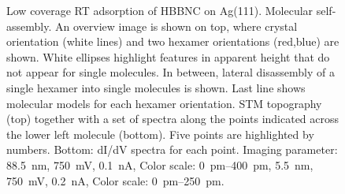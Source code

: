 \begin{figure}[]\centering
	 \quad
	\caption{Low coverage RT adsorption of HBBNC on Ag(111).  Molecular self-assembly. An overview image is shown on top, where crystal orientation (white lines) and two hexamer orientations (red,blue) are shown. White ellipses highlight features in apparent height that do not appear for single molecules. In between, lateral disassembly of a single hexamer into single molecules is shown. Last line shows molecular models for each hexamer orientation.  STM topography (top) together with a set of spectra along the points indicated across the lower left molecule (bottom). Five points are highlighted by numbers. Bottom: dI/dV spectra for each point. Imaging parameter:  \SI{88.5}{\nano \meter}, \SI{750}{\milli \volt}, \SI{0.1}{\nano \ampere}, Color scale: \SIrange{0}{400}{\pico \meter},  \SI{5.5}{\nano \meter}, \SI{750}{\milli \volt}, \SI{0.2}{\nano \ampere}, Color scale: \SIrange{0}{250}{\pico \meter}.}
	\label{fig:HBBNC-assembly-spectra}
\end{figure}
